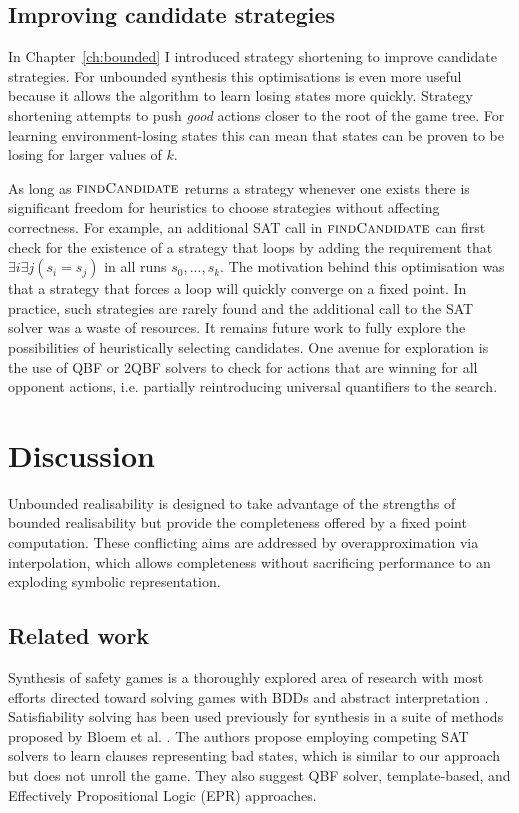 \subsection{Improving candidate strategies}

In Chapter~\ref{ch:bounded} I introduced strategy shortening to improve candidate strategies. For unbounded synthesis this optimisations is even more useful because it allows the algorithm to learn losing states more quickly. Strategy shortening attempts to push \emph{good} actions closer to the root of the game tree. For learning environment-losing states this can mean that states can be proven to be losing for larger values of $k$. 

As long as $\textsc{findCandidate}$ returns a strategy whenever one exists there is significant freedom for heuristics to choose strategies without affecting correctness. For example, an additional SAT call in $\textsc{findCandidate}$ can first check for the existence of a strategy that loops by adding the requirement that $\exists i \exists j (s_i = s_j)$ in all runs $s_0, ..., s_k$. The motivation behind this optimisation was that a strategy that forces a loop will quickly converge on a fixed point. In practice, such strategies are rarely found and the additional call to the SAT solver was a waste of resources. It remains future work to fully explore the possibilities of heuristically selecting candidates. One avenue for exploration is the use of QBF or 2QBF solvers to check for actions that are winning for all opponent actions, i.e. partially reintroducing universal quantifiers to the search.

\section{Discussion}

Unbounded realisability is designed to take advantage of the strengths of bounded realisability but provide the completeness offered by a fixed point computation. These conflicting aims are addressed by overapproximation via interpolation, which allows completeness without sacrificing performance to an exploding symbolic representation.

\subsection{Related work}

Synthesis of safety games is a thoroughly explored area of research with most
efforts directed toward solving games with BDDs \cite{Burch90} and abstract
interpretation \cite{Walker14,Brenguier14}. Satisfiability solving has been used
previously for synthesis in a suite of methods proposed by Bloem et al.
\cite{Bloem14}. The authors propose employing competing SAT solvers to learn
clauses representing bad states, which is similar to our approach but does not
unroll the game.  They also suggest QBF solver, template-based, and Effectively
Propositional Logic (EPR) approaches.

